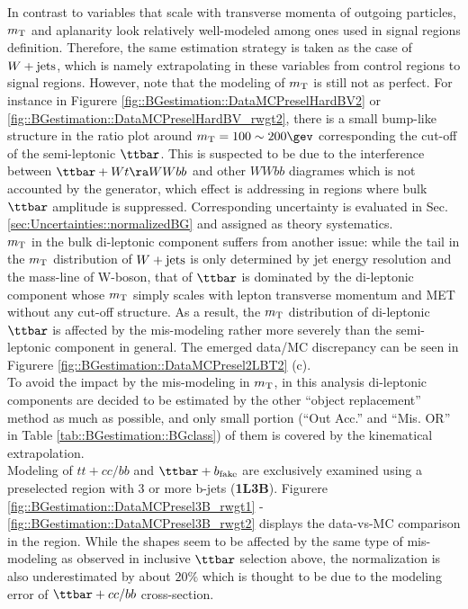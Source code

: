 In contrast to variables that scale with transverse momenta of outgoing particles, $m_{\mathrm{T}}$ and aplanarity look relatively well-modeled among ones used in signal regions definition. Therefore, the same estimation strategy is taken as the case of $W+\mathrm{jets}$, which is namely extrapolating in these variables from control regions to signal regions. 
However, note that the modeling of $m_{\mathrm{T}}$ is still not as perfect. For instance in Figurere \ref{fig::BGestimation::DataMCPreselHardBV2} or \ref{fig::BGestimation::DataMCPreselHardBV_rwgt2}, there is a small bump-like structure in the ratio plot around $\mt = 100\sim200\gev$ corresponding the cut-off of the semi-leptonic $\ttbar$. 
This is suspected to be due to the interference between $\ttbar+Wt\ra WWbb$ and other $WWbb$ diagrames which is not accounted by the generator, which effect is addressing in regions where bulk $\ttbar$ amplitude is suppressed. Corresponding uncertainty is evaluated in Sec. \ref{sec:Uncertainties::normalizedBG} and assigned as theory systematics. \\

$m_{\mathrm{T}}$ in the bulk di-leptonic component suffers from another issue: while the tail in the $m_{\mathrm{T}}$ distribution of $W+\mathrm{jets}$ is only determined by jet energy resolution and the mass-line of W-boson, that of $\ttbar$ is dominated by the di-leptonic component whose $m_{\mathrm{T}}$ simply scales with lepton transverse momentum and MET without any cut-off structure. As a result, the $m_{\mathrm{T}}$ distribution of di-leptonic $\ttbar$ is affected by the mis-modeling rather more severely than the semi-leptonic component in general. The emerged data/MC discrepancy can be seen in Figurere \ref{fig::BGestimation::DataMCPresel2LBT2} (c). \\

To avoid the impact by the mis-modeling in $m_{\mathrm{T}}$, in this analysis di-leptonic components are decided to be estimated by the other ``object replacement'' method as much as possible, and only small portion (``Out Acc.'' and ``Mis. OR'' in Table \ref{tab::BGestimation::BGclass}) of them is covered by the kinematical extrapolation. \\



Modeling of $tt+cc/bb$ and $\ttbarFakeB$ are exclusively examined using a preselected region with 3 or more b-jets (\textbf{1L3B}). Figurere \ref{fig::BGestimation::DataMCPresel3B_rwgt1} - \ref{fig::BGestimation::DataMCPresel3B_rwgt2} displays the data-vs-MC comparison in the region. While the shapes seem to be affected by the same type of mis-modeling as observed in inclusive $\ttbar$ selection above, the normalization is also underestimated by about $20\%$ which is thought to be due to the modeling error of $\ttbar+cc/bb$ cross-section. \\

